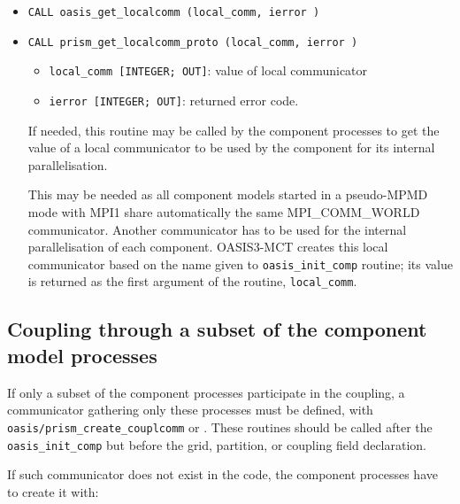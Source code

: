 \begin{itemize}
\item {\tt CALL oasis\_get\_localcomm (local\_comm, ierror )}
\item {\tt CALL prism\_get\_localcomm\_proto (local\_comm, ierror )}

  \begin{itemize}
  \item {\tt local\_comm [INTEGER; OUT]}: value of local communicator
  \item {\tt ierror [INTEGER; OUT]}: returned error code.
  \end{itemize}

  If needed, this routine may be called by the component processes to
  get the value of a local communicator to be used by the component
  for its internal parallelisation.

  This may be needed as all component models started in a pseudo-MPMD
  mode with MPI1 share automatically the same MPI\_COMM\_WORLD
  communicator.  Another communicator has to be used for the internal
  parallelisation of each component. OASIS3-MCT creates this local
  communicator based on the name given to {\tt oasis\_init\_comp}
  routine; its value is returned as the first argument of the routine,
  {\tt local\_comm}.

\end{itemize}

\subsection{Coupling through a subset of the component model
  processes}
\label{subsec_subset}

If only a subset of the component processes participate in the
coupling, a communicator gathering only these processes must be
defined, with {\tt oasis/prism\_create\_couplcomm} or . These routines should be called after
the {\tt oasis\_init\_comp} but before the grid, partition, or
coupling field declaration.

If such communicator does not exist in the code, the component
processes have to create it with:

